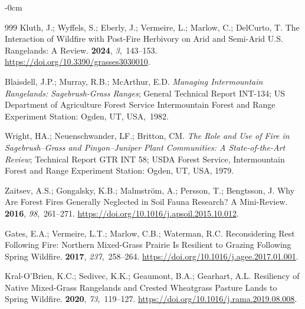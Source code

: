 \documentclass[fire,article,accept,oneauthor,pdftex]{Definitions/mdpi}
\begin{document}
\begin{adjustwidth}{-\extralength}{0cm}
\begin{thebibliography}{999}
Kluth, J.; Wyffels, S.; Eberly, J.; Vermeire, L.; Marlow, C.; DelCurto, T.
\newblock The {{Interaction}} of {{Wildfire}} with {{Post-Fire Herbivory}} on
  {{Arid}} and {{Semi-Arid U}}.{{S}}. {{Rangelands}}: {{A Review}}.
 {\bf 2024}, {\em 3},~143--153.
\newblock
  \url{https://doi.org/10.3390/grasses3030010}.

Blaisdell, J.P.; Murray, R.B.; McArthur, E.D.
\newblock \emph{Managing Intermountain Rangelands: Sagebrush-Grass Ranges};
\newblock General {{Technical Report}} INT-134; {US Department of Agriculture
  Forest Service Intermountain Forest and Range Experiment Station}: Ogden, UT, 
  USA,~1982.

Wright, {\relax HA}.; Neuenschwander, {\relax LF}.; Britton, {\relax CM}.
\newblock \emph{The Role and Use of Fire in Sagebrush--Grass and Pinyon--Juniper
  Plant Communities: A State-of-the-Art Review};
\newblock Technical Report GTR INT 58; {USDA Forest Service, Intermountain
  Forest and Range Experiment Station}: Ogden, UT, USA,  1979.

Zaitsev, A.S.; Gongalsky, K.B.; Malmstr{\"o}m, A.; Persson, T.; Bengtsson, J.
\newblock Why Are Forest Fires Generally Neglected in Soil Fauna Research?
  {{A}} Mini-Review.
 {\bf 2016}, {\em 98},~261--271.
\newblock
  \url{https://doi.org/10.1016/j.apsoil.2015.10.012}.

Gates, E.A.; Vermeire, L.T.; Marlow, C.B.; Waterman, R.C.
\newblock Reconsidering Rest Following Fire: {{Northern}} Mixed-Grass Prairie
  Is Resilient to Grazing Following Spring Wildfire.
 {\bf 2017}, {\em
  237},~258--264.
\newblock
  \url{https://doi.org/10.1016/j.agee.2017.01.001}.

{Kral-O'Brien}, K.C.; Sedivec, K.K.; Geaumont, B.A.; Gearhart, A.L.
\newblock Resiliency of Native Mixed-Grass Rangelands and Crested Wheatgrass
  Pasture Lands to Spring Wildfire.
 {\bf 2020}, {\em 73},~119--127.
\newblock
  \url{https://doi.org/10.1016/j.rama.2019.08.008}.


\end{thebibliography}
\end{adjustwidth}
\end{document}
